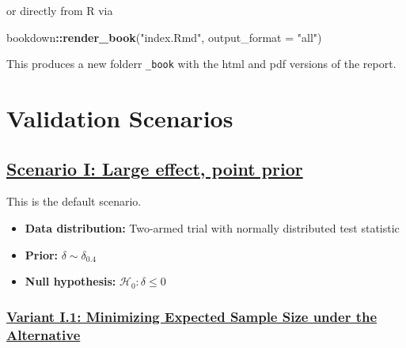 \documentclass[]{book}
\newenvironment{Shaded}{\begin{snugshade}}{\end{snugshade}}
\newcommand{\DataTypeTok}[1]{\textcolor[rgb]{0.13,0.29,0.53}{#1}}
\newcommand{\KeywordTok}[1]{\textcolor[rgb]{0.13,0.29,0.53}{\textbf{#1}}}
\newcommand{\NormalTok}[1]{#1}
\newcommand{\OperatorTok}[1]{\textcolor[rgb]{0.81,0.36,0.00}{\textbf{#1}}}
\newcommand{\StringTok}[1]{\textcolor[rgb]{0.31,0.60,0.02}{#1}}
\providecommand{\tightlist}{%
  \setlength{\itemsep}{0pt}\setlength{\parskip}{0pt}}
\begin{document}
or directly from R via

\begin{Shaded}
\begin{Highlighting}[]
\NormalTok{bookdown}\OperatorTok{::}\KeywordTok{render_book}\NormalTok{(}\StringTok{"index.Rmd"}\NormalTok{, }\DataTypeTok{output_format =} \StringTok{"all"}\NormalTok{)}
\end{Highlighting}
\end{Shaded}

This produces a new folderr \texttt{\_book} with the html and pdf versions
of the report.

\hypertarget{validation-scenarios}{%
\section{Validation Scenarios}\label{validation-scenarios}}

\hypertarget{scenario-i-large-effect-point-prior}{%
\subsection{\texorpdfstring{\protect\hyperlink{scenarioI}{Scenario I: Large effect, point prior}}{Scenario I: Large effect, point prior}}\label{scenario-i-large-effect-point-prior}}

This is the default scenario.

\begin{itemize}
\tightlist
\item
  \textbf{Data distribution:} Two-armed trial with normally distributed test statistic
\item
  \textbf{Prior:} \(\delta\sim\delta_{0.4}\)
\item
  \textbf{Null hypothesis:} \(\mathcal{H}_0:\delta \leq 0\)
\end{itemize}

\hypertarget{variant-i.1-minimizing-expected-sample-size-under-the-alternative}{%
\subsubsection{\texorpdfstring{\protect\hyperlink{variantI_1}{Variant I.1: Minimizing Expected Sample Size under the Alternative}}{Variant I.1: Minimizing Expected Sample Size under the Alternative}}\label{variant-i.1-minimizing-expected-sample-size-under-the-alternative}}
\end{document}
